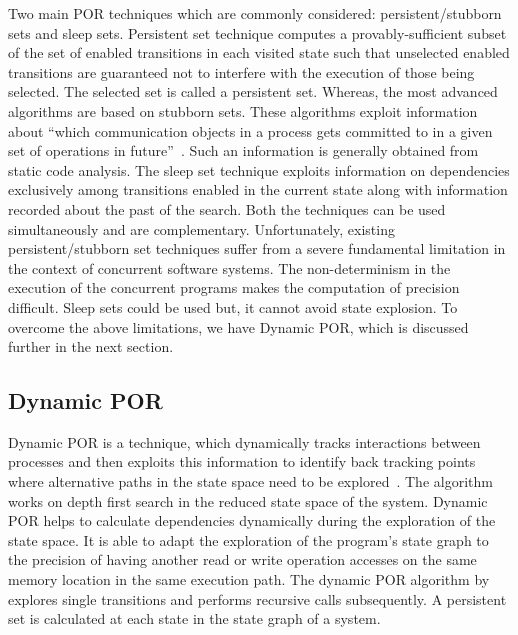 Two main POR techniques which are commonly considered: persistent/stubborn sets and sleep sets. 
Persistent set technique computes a provably-sufficient subset of the set of enabled transitions in each visited state such that unselected enabled transitions are guaranteed not to interfere with the execution of those being selected. 
The selected set is called a persistent set. 
Whereas, the most advanced algorithms are based on stubborn sets. 
These algorithms exploit information about ``which communication objects in a process gets committed to in a given set of operations in future''~\citep{dynamic_por}. 
Such an information is generally obtained from static code analysis. 
The sleep set technique exploits information on dependencies exclusively among transitions enabled in the current state along with information recorded about the past of the search. 
Both the techniques can be used simultaneously and are complementary. 
Unfortunately, existing persistent/stubborn set techniques suffer from a severe fundamental limitation in the context of concurrent software systems. 
The non-determinism in the execution of the concurrent programs makes the computation of precision difficult. 
Sleep sets could be used but, it cannot avoid state explosion. 
To overcome the above limitations, we have Dynamic POR, which is discussed further in the next section. 

\subsection{Dynamic POR}

Dynamic POR is a technique, which dynamically tracks interactions between processes and then exploits this information to identify back tracking points where alternative paths in the state space need to be explored~\citep{dynamic_por}. 
The algorithm works on depth first search in the reduced state space of the system. 
Dynamic POR helps to calculate dependencies dynamically during the exploration of the state space. 
It is able to adapt the exploration of the program's state graph to the precision of having another read or write operation accesses on the same memory location in the same execution path. 
The dynamic POR algorithm by \citet{dynamic_por} explores single transitions and performs recursive calls subsequently. 
A persistent set is calculated at each state in the state graph of a system.

